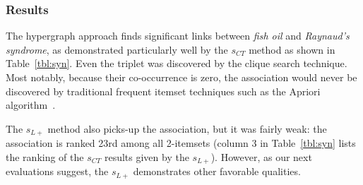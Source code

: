 \subsubsection{Results}
The hypergraph approach finds significant links between \emph{fish oil} and \emph{Raynaud's syndrome}, as demonstrated particularly well by the $s_{CT}$ method as shown in Table~\ref{tbl:syn}. Even the triplet was discovered by the clique search technique.  Most notably, because their co-occurrence is zero, the association would never be discovered by traditional frequent itemset techniques such as the Apriori algorithm~\cite{apriori}.

The $s_{L+}$ method also picks-up the association, but it was fairly weak:  the association is ranked 23rd among all 2-itemsets (column 3 in Table~\ref{tbl:syn} lists the ranking of the $s_{CT}$ results given by the $s_{L+}$).  However, as our next evaluations suggest, the $s_{L+}$ demonstrates other favorable qualities.
